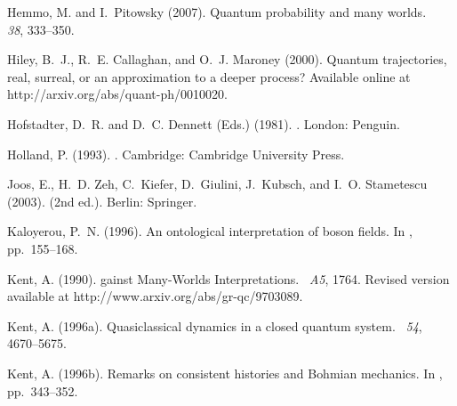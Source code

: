 \documentclass[12pt]{article}
\begin{document}
\begin{thebibliography}{}
Hemmo, M. and I.~Pitowsky (2007).
\newblock Quantum probability and many worlds.
~{\em
  38}, 333--350.

Hiley, B.~J., R.~E. Callaghan, and O.~J. Maroney (2000).
\newblock Quantum trajectories, real, surreal, or an approximation to a deeper
  process?
\newblock Available online at http://arxiv.org/abs/quant-ph/0010020.

Hofstadter, D.~R. and D.~C. Dennett (Eds.) (1981).
.
\newblock London: Penguin.

Holland, P. (1993).
.
\newblock Cambridge: Cambridge University Press.

Joos, E., H.~D. Zeh, C.~Kiefer, D.~Giulini, J.~Kubsch, and I.~O. Stametescu
  (2003).
 (2nd ed.).
\newblock Berlin: Springer.

Kaloyerou, P.~N. (1996).
\newblock An ontological interpretation of boson fields.
\newblock In , pp.\  155--168.

Kent, A. (1990).
gainst {M}any-{W}orlds {I}nterpretations.
~{\em A5}, 1764.
\newblock Revised version available at http://www.arxiv.org/abs/gr-qc/9703089.

Kent, A. (1996a).
\newblock Quasiclassical dynamics in a closed quantum system.
~{\em 54}, 4670--5675.

Kent, A. (1996b).
\newblock Remarks on consistent histories and {B}ohmian mechanics.
\newblock In , pp.\  343--352.


\end{thebibliography}
\end{document}

